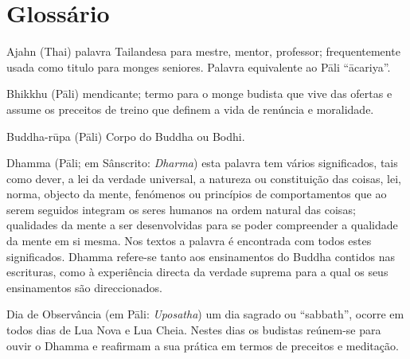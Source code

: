 \chapter{Glossário}

\begin{glossarydescription}


\item[Ajahn] (Thai) palavra Tailandesa para mestre, mentor, professor;
  frequentemente usada como titulo para monges seniores. Palavra equivalente ao
  Pāli “ācariya”.


\item[Bhikkhu] (Pāli) mendicante; termo para o monge budista que vive das
  ofertas e assume os preceitos de treino que definem a vida de renúncia e
  moralidade.

\item[Buddha-rūpa] (Pāli) Corpo do Buddha ou Bodhi.



\item[Dhamma] (Pāli; em Sânscrito: \emph{Dharma}) esta palavra tem vários
  significados, tais como dever, a lei da verdade universal, a natureza ou
  constituição das coisas, lei, norma, objecto da mente, fenómenos ou princípios
  de comportamentos que ao serem seguidos integram os seres humanos na ordem
  natural das coisas; qualidades da mente a ser desenvolvidas para se poder
  compreender a qualidade da mente em si mesma. Nos textos a palavra é
  encontrada com todos estes significados. Dhamma refere-se tanto aos
  ensinamentos do Buddha contidos nas escrituras, como à experiência directa da
  verdade suprema para a qual os seus ensinamentos são direccionados.

\item[Dia de Observância] (em Pāli: \emph{Uposatha}) um dia sagrado ou
  “sabbath”, ocorre em todos dias de Lua Nova e Lua Cheia. Nestes dias os
  budistas reúnem-se para ouvir o Dhamma e reafirmam a sua prática em termos de
  preceitos e meditação.









\end{glossarydescription}
